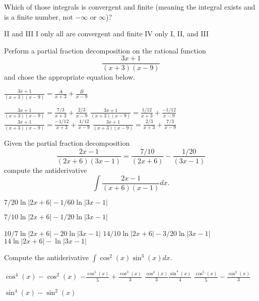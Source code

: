 \documentclass[10pt]{exam}
\begin{document}
\begin{questions}
\question \label{C} Which of those integrals is convergent and finite (meaning the integral exists and is a finite number, not $-\infty$ or $\infty$)?

\begin{choices} %
\choice II and III
\choice I only
\choice all are convergent and finite
\choice IV only
\choice I, II, and III
\end{choices}


\question 
Perform a partial fraction decomposition on the rational function
$$\frac{3x+1}{(x+3)(x-9)}$$
and chose the appropriate equation below.

\begin{choices} %
\choice $\frac{3x+1}{(x+3)(x-9)} = \frac{A}{x+3}+ \frac{B}{x-9}$

\choice $\frac{3x+1}{(x+3)(x-9)} = \frac{7/3}{x+3}+ \frac{2/3}{x-9}$
\choice $\frac{3x+1}{(x+3)(x-9)} = \frac{1/12}{x+3}+ \frac{-1/12}{x-9}$
\choice $\frac{3x+1}{(x+3)(x-9)} = \frac{-1/12}{x+3}+ \frac{1/12}{x-9}$
\choice $\frac{3x+1}{(x+3)(x-9)} = \frac{2/3}{x+3}+ \frac{7/3}{x-9}$
\end{choices}


\question

Given the partial fraction decomposition
$$\frac{2x-1}{(2x+6)(3x-1)} = \frac{7/10}{(2x+6)} - \frac{1/20}{(3x-1)}$$
compute the antiderivative
$$\int \frac{2x-1}{(x+6)(x-1)} dx.$$

\begin{choices}

\choice $7/20 \ln|2x+6| -1/60 \ln|3x-1|$ %

\choice $7/10 \ln|2x+6| -1/20 \ln|3x-1|$

\choice $10/7 \ln|2x+6| -20 \ln|3x-1|$
\choice $14/10 \ln|2x+6| -3/20 \ln|3x-1|$
\choice $14 \ln|2x+6| - \ln|3x-1|$


	
\end{choices}




\question Compute the antiderivative $\int \cos^2(x) \sin^3(x) dx$.


\begin{choices} %

\choice $\cos^4(x) - \cos^2(x)$
\choice $ -\frac{\cos^5(x)}{5} + \frac{\cos^3(x)}{3}$
\choice $\frac{\cos^3(x)}{3}\frac{\sin^4(x)}{4}$
\choice $ \frac{\cos^5(x)}{5} - \frac{\cos^3(x)}{3}$
	
\choice $\sin^4(x) - \sin^2(x)$
\end{choices}



\end{questions}
\end{document}
